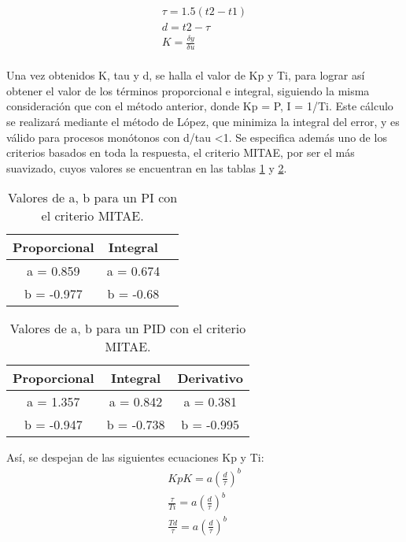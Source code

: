 \begin{align}
\tau = 1.5 (t2-t1) \\
d = t2- \tau \\
K= \frac{\delta y}{\delta u} \\
\label{eq:sist_primer_o_retardo}
\end{align}

Una vez obtenidos K, tau y d, se halla el valor de Kp y Ti, para lograr así obtener el valor de los términos proporcional e integral, siguiendo la misma consideración que con el método anterior, donde Kp = P, I = 1/Ti. Este cálculo se realizará mediante el método de López, que minimiza la integral del error, y es válido para procesos monótonos con d/tau <1. 
Se especifica además uno de los criterios basados en toda la respuesta, el criterio MITAE, por ser el más suavizado, cuyos valores se encuentran en las tablas \ref{tab:valores_PI_MITAE} y \ref{tab:valores_PID_MITAE}.
\begin{table}[htbp]
    \centering
    \caption{Valores de a, b para un PI con el criterio MITAE.}
    \begin{tabular}{|c|c|c|}
        \hline
        Proporcional & Integral  \\
        \hline
        a = 0.859 & a = 0.674\\
        b = -0.977 & b = -0.68\\
        \hline
    \end{tabular}
    \label{tab:valores_PI_MITAE}
\end{table}
\begin{table}[htbp]
    \centering
    \caption{Valores de a, b para un PID con el criterio MITAE.}
    \begin{tabular}{|c|c|c|}
        \hline
        Proporcional & Integral & Derivativo  \\
        \hline
        a = 1.357 & a = 0.842 & a = 0.381\\
        b = -0.947 & b = -0.738& b = -0.995\\
        \hline
    \end{tabular}
    \label{tab:valores_PID_MITAE}
\end{table}

Así, se despejan de las siguientes ecuaciones Kp y Ti:
\begin{align}
Kp K = a (\frac{d}{\tau})^b \\
\frac{\tau}{Ti} = a (\frac{d}{\tau})^b \\
\frac{Td}{\tau} = a (\frac{d}{\tau})^b \\
\label{eq:lopez}
\end{align}


